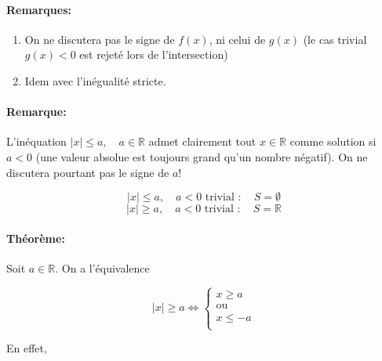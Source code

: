 \documentclass[
    11pt,
    a4paper,
    oneside,
    headinlcude, footinclude,
    twoside,
]{report}
\begin{document}
\paragraph{Remarques:}

\begin{enumerate}
    \item On ne discutera pas le signe de $f(x)$, ni celui de $g(x)$ (le cas
        trivial $g(x)< 0$ est rejet\'e lors de l'intersection)
    \item Idem avec l'in\'egualit\'e stricte.
\end{enumerate}


\paragraph{Remarque:}

L'in\'equation $|x| \leq a, \quad a \in \mathbb{R}$ admet clairement tout $x
\in \mathbb{R}$ comme solution si $a < 0$ (une valeur absolue est toujours
grand qu'un nombre n\'egatif).  On ne discutera pourtant pas le signe de $a$!
 
$$|x| \leq a, \quad a < 0 \text{ trivial } : \quad S = \emptyset$$
$$|x| \geq a, \quad a < 0 \text{ trivial } : \quad S = \mathbb{R}$$

\paragraph{Théorème:}

Soit $a \in \mathbb{R}$. On a l'\'equivalence

$$|x| \geq a \iff \left\{
    \begin{array}{l}
    x \geq a\\
    \text{ou } \\
    x \leq -a\\
    \end{array}
\right.$$

En effet, 
\end{document}
